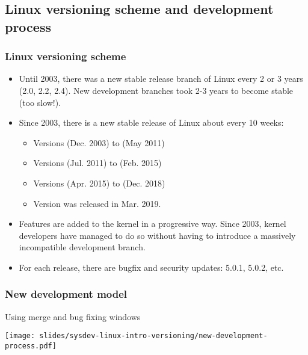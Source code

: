 \subsection{Linux versioning scheme and development process}

\begin{frame}
  \frametitle{Linux versioning scheme}
  \begin{itemize}
  \item Until 2003, there was a new stable release branch of Linux every
        2 or 3 years (2.0, 2.2, 2.4). New development branches took 2-3
        years to become stable (too slow!).
  \item Since 2003, there is a new stable release of Linux about every
	10 weeks:
  \begin{itemize}
	\item Versions  (Dec. 2003) to  (May 2011)
	\item Versions  (Jul. 2011) to  (Feb. 2015)
	\item Versions  (Apr. 2015) to  (Dec. 2018)
	\item Version  was released in Mar. 2019.
  \end{itemize}
  \item Features are added to the kernel in a progressive way. Since
        2003, kernel developers have managed to do so without having
        to introduce a massively incompatible development branch.
  \item For each release, there are bugfix and security updates:
    5.0.1, 5.0.2, etc.
  \end{itemize}
\end{frame}

\begin{frame}
  \frametitle{New development model}
  Using merge and bug fixing windows
  \begin{center}
    \texttt{[image: slides/sysdev-linux-intro-versioning/new-development-process.pdf]}
  \end{center}
\end{frame}

